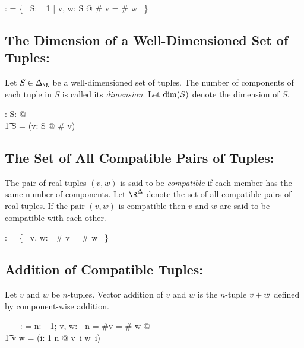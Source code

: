 \documentclass{amsart}
\begin{document}
\begin{axdef}
	\DeltaRinf: \Fam \Rinf
\where
	\DeltaRinf = \{~ S: \power_1 \Rinf | \forall v, w: S @ \# v = \# w ~\}
\end{axdef}

\subsection{The Dimension of a Well-Dimensioned Set of Tuples: }

Let $S \in \DeltaRinf$ be a well-dimensioned set of tuples.
The number of components of each tuple in $S$ is called its \textit{dimension}.
Let $\operatorname{dim}(S)$ denote the dimension of $S$.

\begin{axdef}
\dimRinf: \DeltaRinf \fun \nat
\where
\forall S: \DeltaRinf @ \\
\t1	\dimRinf S = (\mu v: S @ \# v)
\end{axdef}

\subsection{The Set of All Compatible Pairs of Tuples: }

The pair of real tuples $(v, w)$ is said to be \textit{compatible} if each member has the same number of components.
Let $\RinfDelta$ denote the set of all compatible pairs of real tuples.
If the pair $(v, w)$ is compatible then $v$ and $w$ are said to be compatible with each other.

\begin{axdef}
	\RinfDelta: \Rinf \rel \Rinf
\where
	\RinfDelta = \{~ v, w: \Rinf | \# v = \# w ~\}
\end{axdef}

\subsection{Addition of Compatible Tuples: }

Let $v$ and $w$ be $n$-tuples.
Vector addition of $v$ and $w$ is the $n$-tuple $v \mathbin{+} w$ defined by component-wise addition.

\begin{axdef}
	\_ \addRinf \_: \RinfDelta \fun \Rinf
\where
	\langle \rangle \addRinf \langle \rangle = \langle \rangle
\also
\forall n: \nat_1; v, w: \Rinf | n = \#v = \# w @ \\
\t1	v \addRinf w = (\lambda i: 1 \upto n @ v~i \addR w~i)
\end{axdef}
\end{document}
